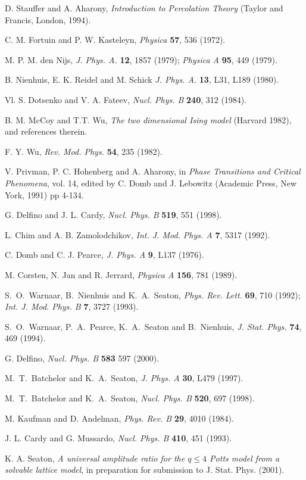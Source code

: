 \documentclass[a4paper,a4paper]{article}
\begin{document}



 
\begin{thebibliography}{99}

D. Stauffer and A. Aharony, {\it Introduction to Percolation Theory} 
(Taylor and 
Francis, London, 1994).

 C. M. Fortuin and P. W. Kasteleyn, {\it Physica} {\bf 57}, 
536 (1972).

M. P. M. den Nijs, {\it J. Phys. A.} {\bf 12}, 1857 (1979);
{\it Physica A} {\bf 95}, 449 (1979).

B. Nienhuis, E. K. Reidel and M. Schick {\it J. Phys. A.} 
{\bf 13}, L31, L189 (1980).

 Vl. S. Dotsenko and V. A. Fateev, {\it Nucl. Phys. B} {\bf 240}, 
312 (1984).

 B. M. McCoy and T.T. Wu, {\it The two dimensional Ising model}
(Harvard 1982), and references therein.

 F. Y. Wu, {\it Rev. Mod. Phys.} {\bf 54}, 235 (1982).

 V. Privman, P. C. Hohenberg and A. Aharony,
in {\it Phase Transitions and Critical Phenomena}, vol. 14, edited by C. Domb
and J. Lebowitz (Academic Press, New York, 1991) pp 4-134.

 G. Delfino and J. L. Cardy, {\it  Nucl. Phys. B} 
{\bf 519}, 551 (1998).

 L. Chim and A. B. Zamolodchikov, {\it Int. J. Mod. Phys. A}
 {\bf 7}, 5317 (1992). 

 C. Domb and C. J. Pearce, {\it J. Phys. A} {\bf 9}, L137 (1976).

 M. Corsten, N. Jan and R. Jerrard, {\it Physica A} {\bf 156},
781 (1989).

S.~O.~Warnaar, B.~Nienhuis and K.~A.~Seaton,
{\it Phys. Rev. Lett.} {\bf 69}, 710 (1992); 
{\it Int. J. Mod. Phys. B} {\bf 7}, 3727 (1993).

S.~O.~Warnaar, P.~A.~Pearce, K.~A.~Seaton and B.~Nienhuis,
{\it J. Stat. Phys.} {\bf 74},  469 (1994).

 G. Delfino, {\it Nucl. Phys. B} {\bf 583} 597 (2000).

M.~T.~Batchelor and K.~A.~Seaton, {\it J. Phys. A} {\bf 30}, L479 (1997).

 M.~T.~Batchelor and K.~A.~Seaton,
{\it Nucl. Phys. B} {\bf 520}, 697 (1998).

 M. Kaufman and D. Andelman, {\it Phys. Rev. B}  {\bf 29}, 4010 
(1984).

 J. L. Cardy and G. Mussardo, 
{\it Nucl. Phys. B} {\bf 410}, 451 (1993).

 K. A. Seaton, {\it A universal amplitude ratio for
the $q\leqslant 4$ Potts model from a solvable lattice model}, in preparation for submission to J. Stat. Phys. (2001).





\end{thebibliography}
\end{document}
